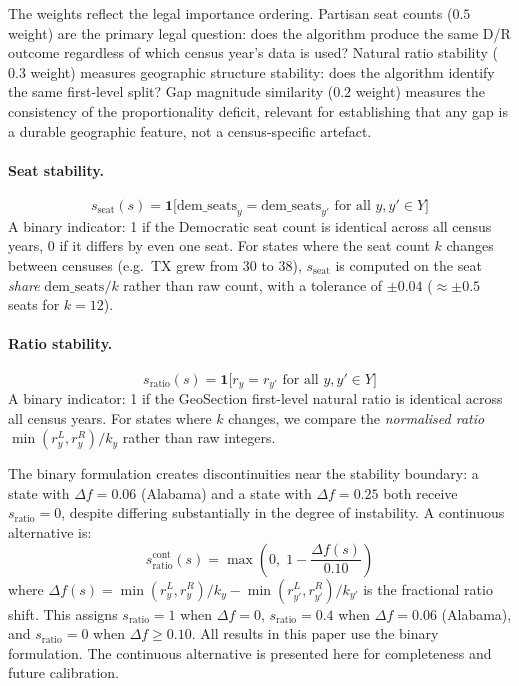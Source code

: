 The weights reflect the legal importance ordering.
Partisan seat counts ($0.5$ weight) are the primary legal question: does the
algorithm produce the same D/R outcome regardless of which census year's data
is used?
Natural ratio stability ($0.3$ weight) measures geographic structure
stability: does the algorithm identify the same first-level split?
Gap magnitude similarity ($0.2$ weight) measures the consistency of the
proportionality deficit, relevant for establishing that any gap is a durable
geographic feature, not a census-specific artefact.

\paragraph{Seat stability.}
\begin{equation}
  s_{\text{seat}}(s) = \mathbf{1}\bigl[\text{dem\_seats}_y = \text{dem\_seats}_{y'}
                       \text{ for all } y, y' \in Y\bigr]
\end{equation}
A binary indicator: 1 if the Democratic seat count is identical across all
census years, 0 if it differs by even one seat.
For states where the seat count $k$ changes between censuses (e.g.\ TX grew from
30 to 38), $s_{\text{seat}}$ is computed on the seat \emph{share}
$\text{dem\_seats}/k$ rather than raw count, with a tolerance of $\pm 0.04$
($\approx \pm0.5$ seats for $k=12$).

\paragraph{Ratio stability.}
\begin{equation}
  s_{\text{ratio}}(s) = \mathbf{1}\bigl[r_y = r_{y'}
                       \text{ for all } y, y' \in Y\bigr]
\end{equation}
A binary indicator: 1 if the GeoSection first-level natural ratio is identical
across all census years.
For states where $k$ changes, we compare the \emph{normalised ratio}
$\min(r_y^L, r_y^R) / k_y$ rather than raw integers.

\begin{remark}
The binary formulation creates discontinuities near the stability boundary:
a state with $\Delta f = 0.06$ (Alabama) and a state with $\Delta f = 0.25$
both receive $s_{\text{ratio}} = 0$, despite differing substantially in the
degree of instability.
A continuous alternative is:
\[
  s^{\text{cont}}_{\text{ratio}}(s) = \max\!\left(0,\; 1 - \frac{\Delta f(s)}{0.10}\right)
\]
where $\Delta f(s) = \min(r_y^L, r_y^R)/k_y - \min(r_{y'}^L, r_{y'}^R)/k_{y'}$
is the fractional ratio shift.
This assigns $s_{\text{ratio}} = 1$ when $\Delta f = 0$, $s_{\text{ratio}} = 0.4$
when $\Delta f = 0.06$ (Alabama), and $s_{\text{ratio}} = 0$ when $\Delta f \geq 0.10$.
All results in this paper use the binary formulation.
The continuous alternative is presented here for completeness and future calibration.
\end{remark}

